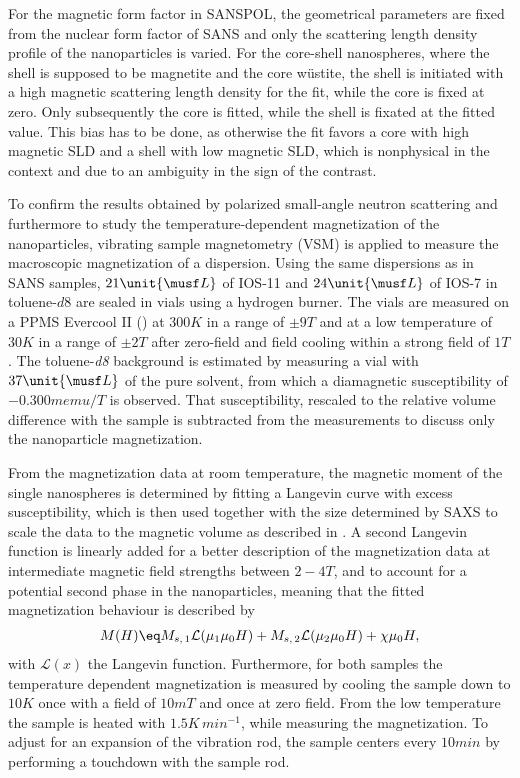 \documentclass[\main/dresen_thesis.tex]{subfiles}
\begin{document}
    For the magnetic form factor in SANSPOL, the geometrical parameters are fixed from the nuclear form factor of SANS and only the scattering length density profile of the nanoparticles is varied.
    For the core-shell nanospheres, where the shell is supposed to be magnetite and the core w\"ustite, the shell is initiated with a high magnetic scattering length density for the fit, while the core is fixed at zero.
    Only subsequently the core is fitted, while the shell is fixated at the fitted value.
    This bias has to be done, as otherwise the fit favors a core with high magnetic SLD and a shell with low magnetic SLD, which is nonphysical in the context and due to an ambiguity in the sign of the contrast.

    To confirm the results obtained by polarized small-angle neutron scattering and furthermore to study the temperature-dependent magnetization of the nanoparticles, vibrating sample magnetometry (VSM) is applied to measure the macroscopic magnetization of a dispersion.
    Using the same dispersions as in SANS samples, $21 \unit{\musf L}$ of IOS-11 and $24 \unit{\musf L}$ of IOS-7 in toluene-$\mathit{d8}$ are sealed in vials using a hydrogen burner.
    The vials are measured on a PPMS Evercool II () at $300 \unit{K}$ in a range of $\pm 9 \unit{T}$ and at a low temperature of $30 \unit{K}$ in a range of $\pm 2 \unit{T}$ after zero-field and field cooling within a strong field of $1 \unit{T}$.
    The toluene-\textit{d8} background is estimated by measuring a vial with $37 \unit{\musf L}$ of the pure solvent, from which a diamagnetic susceptibility of $-0.300 \unit{memu/T}$ is observed.
    That susceptibility, rescaled to the relative volume difference with the sample is subtracted from the measurements to discuss only the nanoparticle magnetization.

    From the magnetization data at room temperature, the magnetic moment of the single nanospheres is determined by fitting a Langevin curve with excess susceptibility, which is then used together with the size determined by SAXS to scale the data to the magnetic volume as described in .
    A second Langevin function is linearly added for a better description of the magnetization data at intermediate magnetic field strengths between $2 - 4 \unit{T}$, and to account for a potential second phase in the nanoparticles, meaning that the fitted magnetization behaviour is described by
    \begin{align}
      M(H) \eq M_{s, \, 1} \mathcal{L} (\mu_{1} \mu_0 H) + M_{s, \, 2} \mathcal{L} (\mu_{2} \mu_0 H) + \chi \mu_0 H,
    \end{align}
    with $\mathcal{L}(x)$ the Langevin function.
    Furthermore, for both samples the temperature dependent magnetization is measured by cooling the sample down to $10 \unit{K}$ once with a field of $10 \unit{mT}$ and once at zero field.
    From the low temperature the sample is heated with $1.5 \unit{K \, min^{-1}}$, while measuring the magnetization.
    To adjust for an expansion of the vibration rod, the sample centers every $10 \unit{min}$ by performing a touchdown with the sample rod.
\end{document}
